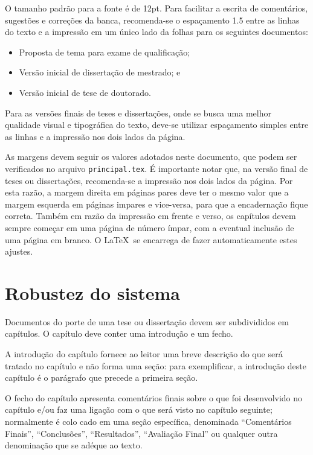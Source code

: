 O tamanho padrão para a fonte é de 12pt.  Para facilitar a escrita de
comentários, sugestões e correções da banca, recomenda-se o espaçamento
1.5 entre as linhas do texto e a impressão em um único lado da folhas
para os seguintes documentos:
\begin{itemize}
\item Proposta de tema para exame de qualificação;
\item Versão inicial de dissertação de mestrado; e
\item Versão inicial de tese de doutorado.
\end{itemize}
Para as versões finais de teses e dissertações, onde se busca uma
melhor qualidade visual e tipográfica do texto, deve-se utilizar
espaçamento simples entre as linhas e a impressão nos dois lados da
página.

As margens devem seguir os valores adotados neste documento, que podem
ser verificados no arquivo \texttt{principal.tex}. É importante notar
que, na versão final de teses ou dissertações, recomenda-se a
impressão nos dois lados da página. Por esta razão, a margem direita
em páginas pares deve ter o mesmo valor que a margem esquerda em
páginas impares e vice-versa, para que a encadernação fique
correta. Também em razão da impressão em frente e verso, os capítulos
devem sempre começar em uma página de número ímpar, com a eventual
inclusão de uma página em branco. O \LaTeX\ se encarrega de fazer
automaticamente estes ajustes.

\section{Robustez do sistema}
\label{RobustezSistema}

Documentos do porte de uma tese ou dissertação devem ser subdivididos
em capítulos. O capítulo deve conter uma introdução e um fecho.

A introdução do capítulo fornece ao leitor uma breve descrição do que
será tratado no capítulo e não forma uma seção: para exemplificar, a
introdução deste capítulo é o parágrafo que precede a primeira seção.

O fecho do capítulo apresenta comentários finais sobre o que foi
desenvolvido no capítulo e/ou faz uma ligação com o que será visto no
capítulo seguinte; normalmente é colo cado em uma seção específica,
denominada ``Comentários Finais'', ``Conclusões'', ``Resultados'',
``Avaliação Final'' ou qualquer outra denominação que se adéque ao
texto.

